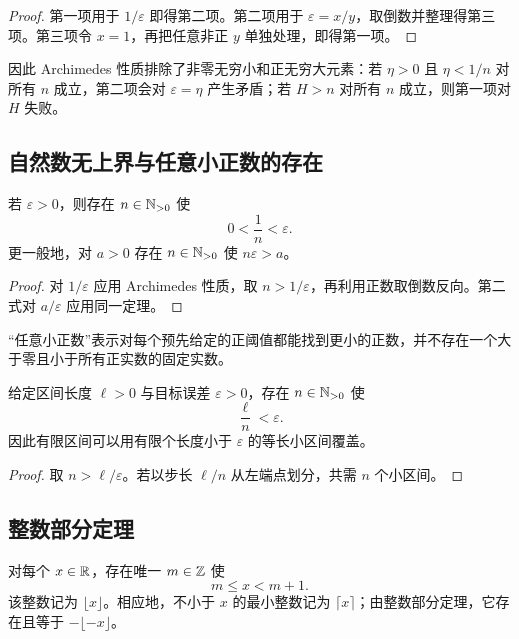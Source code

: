 \begin{proof}
第一项用于 \(1/\varepsilon\) 即得第二项。第二项用于 \(\varepsilon=x/y\)，取倒数并整理得第三项。第三项令 \(x=1\)，再把任意非正 \(y\) 单独处理，即得第一项。
\end{proof}

因此 Archimedes 性质排除了非零无穷小和正无穷大元素：若 \(\eta>0\) 且 \(\eta<1/n\) 对所有 \(n\) 成立，第二项会对 \(\varepsilon=\eta\) 产生矛盾；若 \(H>n\) 对所有 \(n\) 成立，则第一项对 \(H\) 失败。

\subsection{自然数无上界与任意小正数的存在}


\begin{corollary}
若 \(\varepsilon>0\)，则存在 \(n\in\mathbb{N}_{>0}\) 使
\[
 0<\frac1n<\varepsilon.
\]
更一般地，对 \(a>0\) 存在 \(n\in\mathbb{N}_{>0}\) 使 \(n\varepsilon>a\)。
\end{corollary}

\begin{proof}
对 \(1/\varepsilon\) 应用 Archimedes 性质，取 \(n>1/\varepsilon\)，再利用正数取倒数反向。第二式对 \(a/\varepsilon\) 应用同一定理。
\end{proof}

“任意小正数”表示对每个预先给定的正阈值都能找到更小的正数，并不存在一个大于零且小于所有正实数的固定实数。

\begin{corollary}[网格可达到任意精度]
给定区间长度 \(\ell>0\) 与目标误差 \(\varepsilon>0\)，存在 \(n\in\mathbb{N}_{>0}\) 使
\[
 \frac{\ell}{n}<\varepsilon.
\]
因此有限区间可以用有限个长度小于 \(\varepsilon\) 的等长小区间覆盖。
\end{corollary}

\begin{proof}
取 \(n>\ell/\varepsilon\)。若以步长 \(\ell/n\) 从左端点划分，共需 \(n\) 个小区间。
\end{proof}

\subsection{整数部分定理}


\begin{theorem}[整数部分定理]
对每个 \(x\in\mathbb{R}\)，存在唯一 \(m\in\mathbb{Z}\) 使
\[
 m\le x<m+1.
\]
该整数记为 \(\lfloor x\rfloor\)。相应地，不小于 \(x\) 的最小整数记为 \(\lceil x\rceil\)；由整数部分定理，它存在且等于 \(-\lfloor-x\rfloor\)。
\end{theorem}

